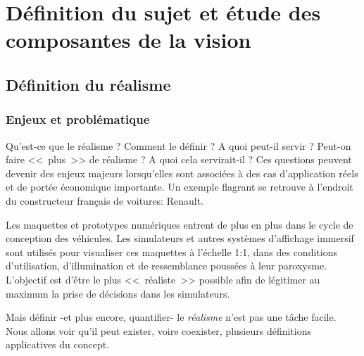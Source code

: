 \part{Définition du sujet et étude des composantes de la vision}
\label{part:edla}

\chapter{Définition du réalisme}
\label{chap:def_realisme}
	\section{Enjeux et problématique}
	\par Qu'est-ce que le réalisme ? Comment le définir ? A quoi peut-il servir ? Peut-on faire <<~plus~>> de réalisme ? A quoi cela servirait-il ? Ces questions peuvent devenir des enjeux majeurs lorsqu'elles sont associées à des cas d'application réels et de portée économique importante. Un exemple flagrant se retrouve à l'endroit du constructeur français de voitures: Renault.
		
	\par Les maquettes et prototypes numériques entrent de plus en plus dans le cycle de conception des véhicules. Les simulateurs et autres systèmes d'affichage immersif sont utilisés pour visualiser ces maquettes à l'échelle 1:1, dans des conditions d'utilisation, d'illumination et de ressemblance poussées à leur paroxysme. L'objectif est d'être le plus <<~réaliste~>> possible afin de légitimer au maximum la prise de décisions dans les simulateurs.
	
	\par Mais définir -et plus encore, quantifier- le \textit{réalisme} n'est pas une tâche facile. Nous allons voir qu'il peut exister, voire coexister, plusieurs définitions applicatives du concept.
	
